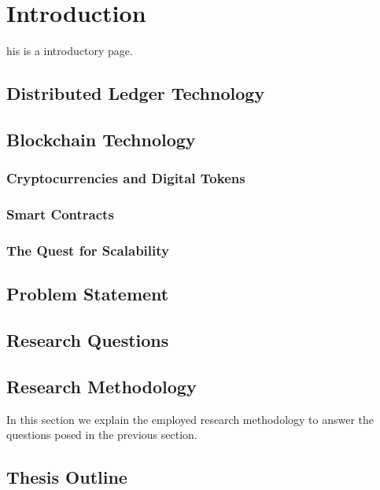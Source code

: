 \chapter{Introduction}
\label{introduction}


his is a introductory page.

\section{Distributed Ledger Technology}

\section{Blockchain Technology}

\subsection{Cryptocurrencies and Digital Tokens}

\subsection{Smart Contracts}

\subsection{The Quest for Scalability}

\section{Problem Statement}

\section{Research Questions}

\section{Research Methodology}


In this section we explain the employed research methodology to answer the questions posed in the previous section.



\section{Thesis Outline}